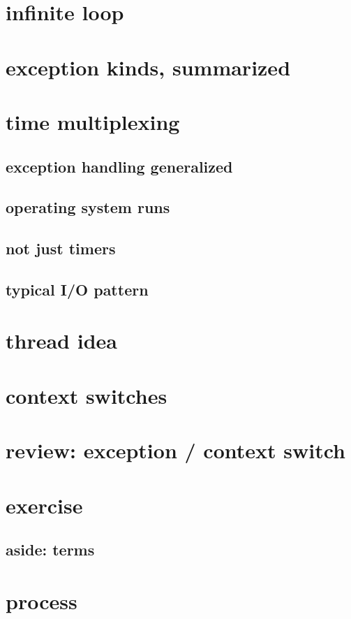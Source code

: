 \section{infinite loop}



\section{exception kinds, summarized}


\section{time multiplexing}


\subsection{exception handling generalized}


\subsection{operating system runs}


\subsection{not just timers}




\subsection{typical I/O pattern}


\section{thread idea}


\section{context switches} 


\section{review: exception / context switch}


\section{exercise}


\subsection{aside: terms}



\section{process}


